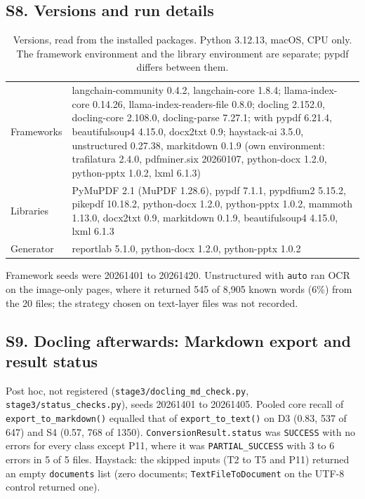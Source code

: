 \subsection*{S8. Versions and run details}
\begin{table}[H]
\caption{Versions, read from the installed packages. Python 3.12.13, macOS, CPU only. The framework environment and the library environment are separate; pypdf differs between them.\label{tab:versions}}
\begin{ruledtabular}
\begin{tabular}{lp{}}
Frameworks & langchain-community 0.4.2, langchain-core 1.8.4; llama-index-core 0.14.26, llama-index-readers-file 0.8.0; docling 2.152.0, docling-core 2.108.0, docling-parse 7.27.1; with pypdf 6.21.4, beautifulsoup4 4.15.0, docx2txt 0.9; haystack-ai 3.5.0, unstructured 0.27.38, markitdown 0.1.9 (own environment: trafilatura 2.4.0, pdfminer.six 20260107, python-docx 1.2.0, python-pptx 1.0.2, lxml 6.1.3) \\
Libraries & PyMuPDF 2.1 (MuPDF 1.28.6), pypdf 7.1.1, pypdfium2 5.15.2, pikepdf 10.18.2, python-docx 1.2.0, python-pptx 1.0.2, mammoth 1.13.0, docx2txt 0.9, markitdown 0.1.9, beautifulsoup4 4.15.0, lxml 6.1.3 \\
Generator & reportlab 5.1.0, python-docx 1.2.0, python-pptx 1.0.2 \\
\end{tabular}
\end{ruledtabular}
\end{table}
Framework seeds were 20261401 to 20261420. Unstructured with \texttt{auto} ran OCR on the image-only pages, where it returned 545 of 8,905 known words (6\%) from the 20 files; the strategy chosen on text-layer files was not recorded.

\subsection*{S9. Docling afterwards: Markdown export and result status}
Post hoc, not registered (\texttt{stage3/docling\_md\_check.py}, \texttt{stage3/status\_checks.py}), seeds 20261401 to 20261405. Pooled core recall of \texttt{export\_to\_markdown()} equalled that of \texttt{export\_to\_text()} on D3 (0.83, 537 of 647) and S4 (0.57, 768 of 1350). \texttt{ConversionResult.status} was \texttt{SUCCESS} with no errors for every class except P11, where it was \texttt{PARTIAL\_SUCCESS} with 3 to 6 errors in 5 of 5 files. Haystack: the skipped inputs (T2 to T5 and P11) returned an empty \texttt{documents} list (zero documents; \texttt{TextFileToDocument} on the UTF-8 control returned one).

